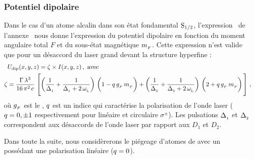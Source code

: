 \subsubsection{Potentiel dipolaire}

Dans le cas d'un atome alcalin dans son état fondamental ${{\rm S}_{{1}/{2}}}$, l'expression~ de l'annexe~ nous donne l'expression du potentiel dipolaire en fonction du moment angulaire total $F$ et du sous-état magnétique ${m_{_F}}$. Cette expression n'est valide que pour un désaccord du laser grand devant la structure hyperfine %
%
:
\begin{align}
	&\Udip\xyz = \PropUI \times I\xyz 
\virguleformule
\text{ avec }
	\label{eq:UpropI}
\\
	\PropUI &= 
	\frac{\pulsSpont\,{\LO}^3}{16\,\pi^2\,c}\,
	\left[
	\left(\dfrac{1
	}{\desacU}
	+\dfrac{1
	}{\desacU + 2\,\pulsLaser}
	\right)\,
	\left( 1 - \polarindice \, \gF \, \mF \vphantom{\dfrac{1}{\desacU + 2\,\pulsLaser}}
	\right)
	+ 
	\left(\dfrac{1
	}{\desacD}
	+\dfrac{1
	}{\desacD + 2\,\pulsLaser}
	\right)\,
	\left( 2 + \polarindice \, \gF \, \mF \vphantom{\dfrac{1}{\desacU + 2\,\pulsLaser}}
	\right)
	\vphantom{\,\sum_{j \in \OrbitalPJdeux} }
	\right]\nonumber
\virguleformule
\end{align}%
%
où ${g_{_F}}$ est le , ${q}$ est un indice qui caractérise la polarisation de l'onde laser (${q}=0,\pm1$ respectivement pour linéaire et circulaire $\sigma^\pm$). Les pulsations ${\Delta_{_{1}}}$ et ${\Delta_{_{2}}}$ correspondent aux désaccords de l'onde laser par rapport aux  $D_1$ et $D_2$.

%
Dans toute la suite, nous considèrerons le piégeage d'atomes de \Rb avec un \fld possédant une polarisation linéaire (${q}=0$).



